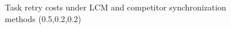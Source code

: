 \documentclass{sig-alternate}
\begin{document}
\begin{figure}[htbp]
{}
\caption{Task retry costs under LCM and competitor synchronization methods (0.5,0.2,0.2)}
\label{fig:RC_results_0.5_0.2_0.2}
\end{figure}
\end{document}
